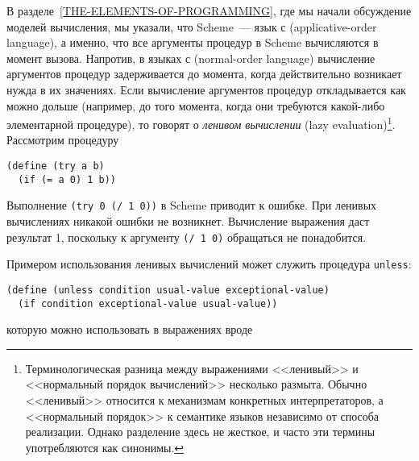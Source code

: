 В 
разделе~\ref{THE-ELEMENTS-OF-PROGRAMMING},
где мы начали обсуждение моделей вычисления, мы указали, что Scheme~--- язык с  
 (applicative-order language), а 
именно, что все аргументы процедур в Scheme вычисляются в момент
вызова. Напротив, в языках с 
 (normal-order language) вычисление аргументов процедур 
задерживается до
момента,  когда действительно возникает нужда в их значениях. Если
вычисление аргументов процедур откладывается как можно дольше
(например, до того момента, когда они требуются какой-либо
элементарной процедуре),  то говорят о 
{\em ленивом вычислении} (lazy
evaluation)\footnote{Терминологическая разница между выражениями
<<ленивый>> и <<нормальный порядок вычислений>> несколько размыта.  Обычно
<<ленивый>> относится к механизмам конкретных интерпретаторов, а
<<нормальный порядок>> к семантике языков независимо от способа
реализации.  Однако разделение здесь не жесткое, и часто эти термины
употребляются как синонимы.}.
Рассмотрим процедуру

\begin{Verbatim}[fontsize=\small]
(define (try a b)
  (if (= a 0) 1 b))
\end{Verbatim}
Выполнение {\tt (try 0 (/ 1 0))} в Scheme приводит к ошибке.
При ленивых вычислениях никакой ошибки не возникнет.  Вычисление
выражения даст результат 1, поскольку к аргументу {\tt (/ 1 0)}
обращаться не понадобится.

Примером использования ленивых вычислений может служить
процедура {\tt unless}:

\begin{Verbatim}[fontsize=\small]
(define (unless condition usual-value exceptional-value)
  (if condition exceptional-value usual-value))
\end{Verbatim}
которую можно использовать в выражениях вроде

